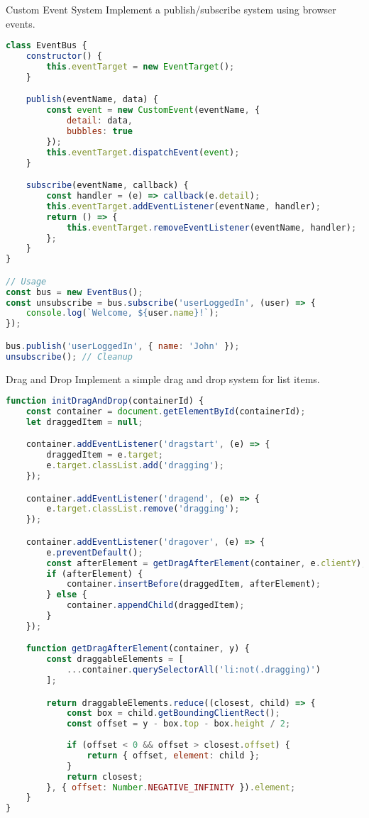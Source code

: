 \begin{example2}{Custom Event System}
Implement a publish/subscribe system using browser events.

\begin{lstlisting}[language=JavaScript, style=basesmol]
class EventBus {
    constructor() {
        this.eventTarget = new EventTarget();
    }

    publish(eventName, data) {
        const event = new CustomEvent(eventName, {
            detail: data,
            bubbles: true
        });
        this.eventTarget.dispatchEvent(event);
    }

    subscribe(eventName, callback) {
        const handler = (e) => callback(e.detail);
        this.eventTarget.addEventListener(eventName, handler);
        return () => {
            this.eventTarget.removeEventListener(eventName, handler);
        };
    }
}

// Usage
const bus = new EventBus();
const unsubscribe = bus.subscribe('userLoggedIn', (user) => {
    console.log(`Welcome, ${user.name}!`);
});

bus.publish('userLoggedIn', { name: 'John' });
unsubscribe(); // Cleanup
\end{lstlisting}
\end{example2}

\begin{example2}{Drag and Drop}
Implement a simple drag and drop system for list items.

\begin{lstlisting}[language=JavaScript, style=basesmol]
function initDragAndDrop(containerId) {
    const container = document.getElementById(containerId);
    let draggedItem = null;

    container.addEventListener('dragstart', (e) => {
        draggedItem = e.target;
        e.target.classList.add('dragging');
    });

    container.addEventListener('dragend', (e) => {
        e.target.classList.remove('dragging');
    });

    container.addEventListener('dragover', (e) => {
        e.preventDefault();
        const afterElement = getDragAfterElement(container, e.clientY);
        if (afterElement) {
            container.insertBefore(draggedItem, afterElement);
        } else {
            container.appendChild(draggedItem);
        }
    });

    function getDragAfterElement(container, y) {
        const draggableElements = [
            ...container.querySelectorAll('li:not(.dragging)')
        ];

        return draggableElements.reduce((closest, child) => {
            const box = child.getBoundingClientRect();
            const offset = y - box.top - box.height / 2;
            
            if (offset < 0 && offset > closest.offset) {
                return { offset, element: child };
            }
            return closest;
        }, { offset: Number.NEGATIVE_INFINITY }).element;
    }
}
\end{lstlisting}
\end{example2}

